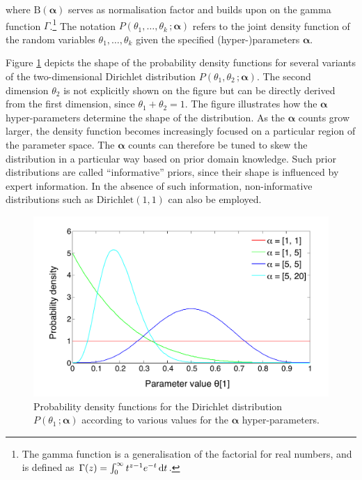 where $ \mathrm{B}(\boldsymbol\alpha)$ serves as normalisation factor and builds upon on the gamma function $\Gamma$.\footnote{The gamma function is a generalisation of the factorial for real numbers, and is defined as $\Gamma(z) = \int_0^\infty  t^{z-1} e^{-t}\,{\rm d}t$.} The notation $P(\theta_1, \dots, \theta_k\,; \boldsymbol\alpha)$ refers to the joint density function of the random variables $\theta_1, \dots, \theta_k$ given the specified (hyper-)parameters $\boldsymbol\alpha$. 

Figure \ref{fig:dirichletfun} depicts the shape of the probability density functions for several variants of the two-dimensional Dirichlet distribution $P(\theta_1,\theta_2\,; \boldsymbol\alpha)$.  The second dimension $\theta_2$ is not explicitly shown on the figure but can be directly derived from the first dimension, since $\theta_1 + \theta_2=1$.  The figure illustrates how the $\boldsymbol\alpha$ hyper-parameters determine the shape of the distribution. As the $\boldsymbol\alpha$ counts grow larger, the density function becomes increasingly focused on a particular region of the parameter space.  The $\boldsymbol\alpha$ counts can therefore be tuned to skew the distribution in a particular way based on prior domain knowledge. Such prior distributions are called ``informative'' priors, since their shape is influenced by expert information. In the absence of such information, non-informative distributions such as $\mathrm{Dirichlet}(1,1)$ can also be employed. 

\begin{figure}[h]
\centering
\includegraphics[scale=0.45]{imgs/dirichletfun.pdf}
\caption{Probability density functions for the Dirichlet distribution $P(\theta_1 \,; \boldsymbol\alpha)$  according to various values for the $\boldsymbol\alpha$ hyper-parameters.}
\label{fig:dirichletfun}
\end{figure}

